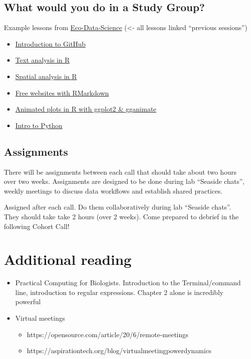 \documentclass[
  letterpaper,
  DIV=11,
  numbers=noendperiod]{scrreprt}
\providecommand{\tightlist}{%
  \setlength{\itemsep}{0pt}\setlength{\parskip}{0pt}}
\begin{document}
\hypertarget{what-would-you-do-in-a-study-group}{%
\subsection{What would you do in a Study
Group?}\label{what-would-you-do-in-a-study-group}}

Example lessons from
\href{http://eco-data-science.github.io/}{Eco-Data-Science} (\textless-
all lessons linked ``previous sessions'')

\begin{itemize}
\tightlist
\item
  \href{https://github.com/eco-data-science/github-intro-2}{Introduction
  to GitHub}
\item
  \href{https://github.com/oharac/text_workshop}{Text analysis in R}
\item
  \href{https://github.com/eco-data-science/spatial-analysis-R}{Spatial
  analysis in R}
\item
  \href{https://jules32.github.io/rmarkdown-website-tutorial/}{Free
  websites with RMarkdown}
\item
  \href{https://raw.githack.com/allisonhorst/eds-ggplot2-gganimate/master/gganimate_key.html}{Animated
  plots in R with ggplot2 \& gganimate}
\item
  \href{http://eco-data-science.github.io/}{Intro to Python}
\end{itemize}

\hypertarget{assignments}{%
\subsection{Assignments}\label{assignments}}

There will be assignments between each call that should take about two
hours over two weeks. Assignments are designed to be done during lab
``Seaside chats'', weekly meetings to discuss data workflows and
establish shared practices.

Assigned after each call. Do them collaboratively during lab ``Seaside
chats''. They should take take 2 hours (over 2 weeks). Come prepared to
debrief in the following Cohort Call!

\hypertarget{additional-reading}{%
\section{Additional reading}\label{additional-reading}}

\begin{itemize}
\tightlist
\item
  Practical Computing for Biologists. Introduction to the
  Terminal/command line, introduction to regular expressions. Chapter 2
  alone is incredibly powerful
\item
  Virtual meetings

  \begin{itemize}
  \tightlist
  \item
    https://opensource.com/article/20/6/remote-meetings
  \item
    https://aspirationtech.org/blog/virtualmeetingpowerdynamics
  \end{itemize}
\end{itemize}
\end{document}
